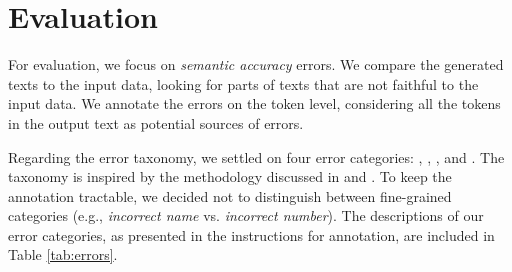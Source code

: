 \section{Evaluation}
\label{sec:eval}
For evaluation, we focus on \textit{semantic accuracy} errors. We compare the generated texts to the input data, looking for parts of texts that are not faithful to the input data. We annotate the errors on the token level, considering all the tokens in the output text as potential sources of errors.

Regarding the error taxonomy, we settled on four error categories: , , , and . The taxonomy is inspired by the methodology discussed in \citet{thomsonGoldStandardMethodology2020} and \citet{thomson2023evaluating}. To keep the annotation tractable, we decided not to distinguish between fine-grained categories (e.g., \textit{incorrect name} vs. \textit{incorrect number}). The descriptions of our error categories, as presented in the instructions for annotation, are included in Table \ref{tab:errors}.

